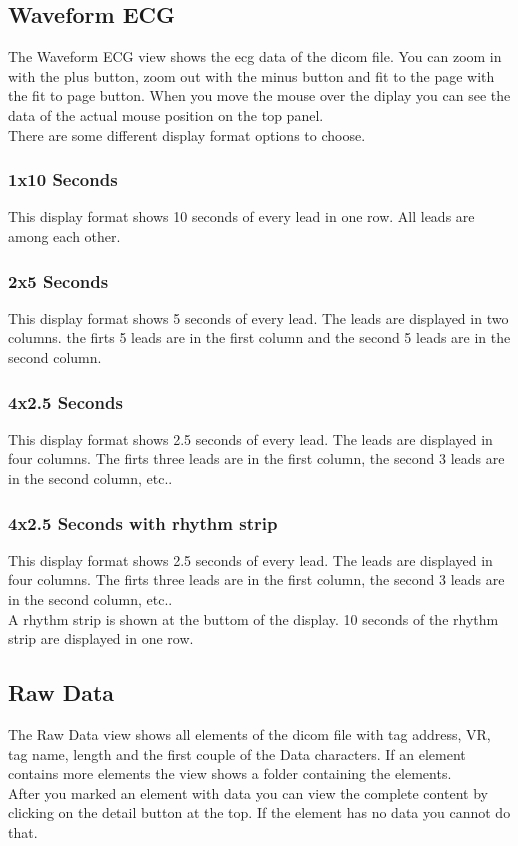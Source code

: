 	\subsection{Waveform ECG}
	The Waveform ECG view shows the ecg data of the dicom file. You can zoom in
	with the plus button, zoom out with the minus button and fit to the page with
	the fit to page button. When you move the mouse over the diplay you can see the
	data of the actual mouse position on the top panel. \\
	There are some different display format options to choose.
		
		\subsubsection{1x10 Seconds}
		This display format shows 10 seconds of every lead in one row. All leads are
		among each other.
		
		\subsubsection{2x5 Seconds}
		This display format shows 5 seconds of every lead. The leads are displayed in
		two columns. the firts 5 leads are in the first column and the second 5 leads
		are in the second column.
		
		\subsubsection{4x2.5 Seconds}
		This display format shows 2.5 seconds of every lead. The leads are displayed
		in four columns. The firts three leads are in the first column, the second 3
		leads are in the second column, etc..
		
		\subsubsection{4x2.5 Seconds with rhythm strip}
		This display format shows 2.5 seconds of every lead. The leads are displayed
		in four columns. The firts three leads are in the first column, the second 3
		leads are in the second column, etc..\\
		A rhythm strip is shown at the buttom of the display. 10 seconds of the rhythm
		strip are displayed in one row. 

	\subsection{Raw Data}
	The Raw Data view shows all elements of the dicom file with tag address, VR,
	tag name, length and the first couple of the Data characters.
	If an element contains more elements the view shows a folder containing the
	elements.\\
	After you marked an element with data you can view the complete content
	by clicking on the detail button at the top. If the element has no data you
	cannot do that.\\
		
